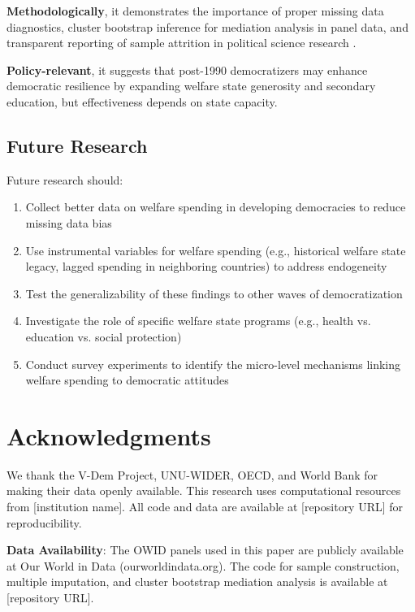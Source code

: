 \documentclass[11pt,letterpaper]{article}
\begin{document}
\textbf{Methodologically}, it demonstrates the importance of proper missing data diagnostics, cluster bootstrap inference for mediation analysis in panel data, and transparent reporting of sample attrition in political science research \cite{Imai2010, Cameron2015}.

\textbf{Policy-relevant}, it suggests that post-1990 democratizers may enhance democratic resilience by expanding welfare state generosity and secondary education, but effectiveness depends on state capacity.

\subsection{Future Research}

Future research should:

\begin{enumerate}
  \item Collect better data on welfare spending in developing democracies to reduce missing data bias
  \item Use instrumental variables for welfare spending (e.g., historical welfare state legacy, lagged spending in neighboring countries) to address endogeneity
  \item Test the generalizability of these findings to other waves of democratization
  \item Investigate the role of specific welfare state programs (e.g., health vs. education vs. social protection)
  \item Conduct survey experiments to identify the micro-level mechanisms linking welfare spending to democratic attitudes
\end{enumerate}

\section*{Acknowledgments}

We thank the V-Dem Project, UNU-WIDER, OECD, and World Bank for making their data openly available. This research uses computational resources from [institution name]. All code and data are available at [repository URL] for reproducibility.

\textbf{Data Availability}: The OWID panels used in this paper are publicly available at Our World in Data (ourworldindata.org). The code for sample construction, multiple imputation, and cluster bootstrap mediation analysis is available at [repository URL].
\end{document}
